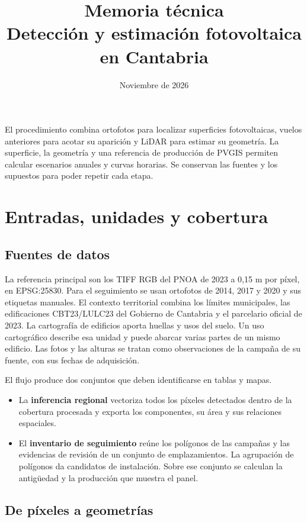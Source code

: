 \documentclass[11pt,a4paper]{article}
\title{Memoria técnica\\Detección y estimación fotovoltaica en Cantabria}
\author{}
\date{Noviembre de 2026}
\begin{document}
\maketitle

El procedimiento combina ortofotos para localizar superficies fotovoltaicas, vuelos anteriores para acotar su aparición y LiDAR para estimar su geometría. La superficie, la geometría y una referencia de producción de PVGIS permiten calcular escenarios anuales y curvas horarias. Se conservan las fuentes y los supuestos para poder repetir cada etapa.

\tableofcontents

\section{Entradas, unidades y cobertura}

\subsection{Fuentes de datos}

La referencia principal son los TIFF RGB del PNOA de 2023 a 0,15 m por píxel, en EPSG:25830. Para el seguimiento se usan ortofotos de 2014, 2017 y 2020 y sus etiquetas manuales. El contexto territorial combina los límites municipales, las edificaciones CBT23/LULC23 del Gobierno de Cantabria y el parcelario oficial de 2023. La cartografía de edificios aporta huellas y usos del suelo. Un uso cartográfico describe esa unidad y puede abarcar varias partes de un mismo edificio. Las fotos y las alturas se tratan como observaciones de la campaña de su fuente, con sus fechas de adquisición. \cite{pnoa,catastro}

El flujo produce dos conjuntos que deben identificarse en tablas y mapas.
\begin{itemize}
  \item La \textbf{inferencia regional} vectoriza todos los píxeles detectados dentro de la cobertura procesada y exporta los componentes, su área y sus relaciones espaciales.
  \item El \textbf{inventario de seguimiento} reúne los polígonos de las campañas y las evidencias de revisión de un conjunto de emplazamientos. La agrupación de polígonos da candidatos de instalación. Sobre ese conjunto se calculan la antigüedad y la producción que muestra el panel.
\end{itemize}

\subsection{De píxeles a geometrías}
\end{document}
